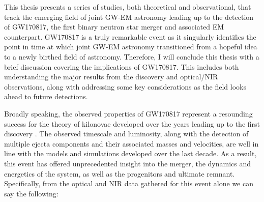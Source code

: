 This thesis presents a series of studies, both theoretical and observational, that track the emerging field of joint GW-EM astronomy leading up to the detection of GW170817, the first binary neutron star merger and associated EM counterpart. GW170817 is a truly remarkable event as it singularly identifies the point in time at which joint GW-EM astronomy transitioned from a hopeful idea to a newly birthed field of astronomy. Therefore, I will conclude this thesis with a brief discussion covering the implications of GW170817. This includes both understanding the major results from the discovery and optical/NIR observations, along with addressing some key considerations as the field looks ahead to future detections.

Broadly speaking, the observed properties of GW170817 represent a resounding success for the theory of kilonovae developed over the years leading up to the first discovery \citep{LP98,Rosswog+99,Metzger+10,BarnesKasen13,FernandezMetzger13,TanakaHotokezaka13,Barnes+16,Sekiguchi+16}. The observed timescale and luminosity, along with the detection of multiple ejecta components and their associated masses and velocities, are well in line with the models and simulations developed over the last decade. As a result, this event has offered unprecedented insight into the merger, the dynamics and energetics of the system, as well as the progenitors and ultimate remnant. Specifically, from the optical and NIR data gathered for this event alone we can say the following:
